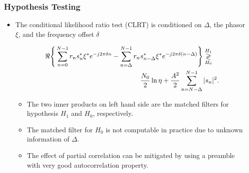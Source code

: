 \begin{frame}
    \frametitle{Hypothesis Testing}
    \begin{itemize}

      \item The conditional likelihood ratio test (CLRT) is conditioned on $\Delta$, the phasor $\xi$, and the frequency offset $\delta$
  
      \begin{equation*}
          \label{eq:log likelihood}
          \begin{aligned}
          \Re\Bigg\{\sum_{n=0}^{N-1}r_ns_n^*\xi^*e^{-j2\pi\delta n}-\sum_{n=\Delta}^{N-1}r_n&s_{n-\Delta}^*\xi^*e^{-j2\pi\delta(n-\Delta)}\Bigg\} \mathrel{\mathop\gtrless\limits^{H_1}_{H_0}} \\
          &\frac{N_0}{2}\ln\eta+\frac{A^2}{2}\sum_{n=N{-}\Delta}^{N-1}|s_n|^2.
          \end{aligned}
      \end{equation*}
  
      \begin{itemize}
          \item The two inner products on left hand side are the matched filters for hypothesis $H_1$ and $H_0$, respectively.
          \item The matched filter for $H_0$ is not computable in practice due to unknown information of $\Delta$.
          \item The effect of partial correlation can be mitigated by using a preamble with very good autocorrelation property.
      \end{itemize}
      
  \end{itemize}

\end{frame}

